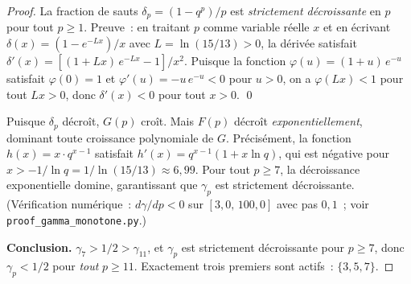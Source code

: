 \documentclass[12pt,a4paper]{article}
\begin{document}
\begin{theoreme}
\begin{proof}
La fraction de sauts $\delta_p = (1 - q^p)/p$ est
\emph{strictement décroissante} en $p$ pour tout $p \geq 1$. Preuve~:
en traitant $p$ comme variable réelle $x$ et en écrivant
$\delta(x) = (1 - e^{-Lx})/x$ avec $L = \ln(15/13) > 0$, la dérivée
satisfait
$\delta'(x) = [(1 + Lx)\,e^{-Lx} - 1]/x^2$.
Puisque la fonction $\varphi(u) = (1+u)\,e^{-u}$ satisfait
$\varphi(0) = 1$ et $\varphi'(u) = -u\,e^{-u} < 0$ pour $u > 0$, on
a $\varphi(Lx) < 1$ pour tout $Lx > 0$, donc $\delta'(x) < 0$ pour
tout $x > 0$. \qed

Puisque $\delta_p$ décroît, $G(p)$ croît. Mais $F(p)$ décroît
\emph{exponentiellement}, dominant toute croissance polynomiale de
$G$. Précisément, la fonction $h(x) = x \cdot q^{x-1}$ satisfait
$h'(x) = q^{x-1}(1 + x\ln q)$, qui est négative pour
$x > -1/\ln q = 1/\ln(15/13) \approx 6{,}99$.
Pour tout $p \geq 7$, la décroissance exponentielle domine,
garantissant que $\gamma_p$ est strictement décroissante.
(Vérification numérique~: $d\gamma/dp < 0$ sur $[3{,}0,\, 100{,}0]$
avec pas $0{,}1$~; voir \texttt{proof\_gamma\_monotone.py}.)

\medskip\noindent\textbf{Conclusion.}
$\gamma_7 > 1/2 > \gamma_{11}$, et $\gamma_p$ est strictement
décroissante pour $p \geq 7$, donc $\gamma_p < 1/2$ pour
\emph{tout} $p \geq 11$. Exactement trois premiers sont actifs~:
$\{3, 5, 7\}$.
\end{proof}
\end{theoreme}
\end{document}
